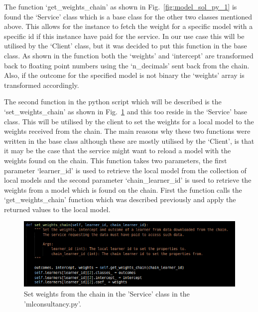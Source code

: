 \noindent
The function ‘get\_weights\_chain’ as shown in Fig.~\ref{fig:model_sol_py_1} is found the ‘Service’ class which is a base class for the other two classes mentioned above. This allows for the instance to fetch the weight for a specific model with a specific id if this instance have paid for the service. In our use case this will be utilised by the ‘Client’ class, but it was decided to put this function in the base class. As shown in the function both the ‘weights’ and ‘intercept’ are transformed back to floating point numbers using the ‘n\_decimals’ sent back from the chain. Also, if the outcome for the specified model is not binary the ‘weights’ array is transformed accordingly. 

\noindent
The second function in the python script which will be described is the ‘set\_weights\_chain’ as shown in Fig.~\ref{fig:model_sol_py_2} and this too reside in the ‘Service’ base class. This will be utilised by the client to set the weights for a local model to the weights received from the chain. The main reasons why these two functions were written in the base class although these are mostly utilised by the ‘Client’, is that it may be the case that the service might want to reload a model with the weights found on the chain. This function takes two parameters, the first parameter ‘learner\_id’ is used to retrieve the local model from the collection of local models and the second parameter ‘chain\_learner\_id’ is used to retrieve the weights from a model which is found on the chain. First the function calls the ‘get\_weights\_chain’ function which was described previously and apply the returned values to the local model. 

\begin{figure}[H]
\centering
  \includegraphics[scale = .65]{imgs/model_sol_py_2.png}
  \caption{Set weights from the chain in the 'Service' class in the 'mlconsultancy.py'.}
  \label{fig:model_sol_py_2}
\end{figure}


